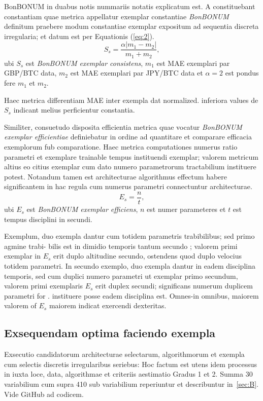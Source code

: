 \documentclass[preprint,3p,times,twocolumn]{elsarticle}  %
\begin{document}
BonBONUM in duabus notis nummariis notatis explicatum est. A constituebant 
constantiam quae metrica appellatur exemplar constantiae \textit{BonBONUM}
 definitum praebere modum constantiae exemplar expositum ad sequentia discreta 
irregularia; et datum est per Equationis (\ref{eq:2}).
\begin{equation}\label{eq:2}
                   S\!{_s} = \frac{\alpha|m_1-m_2|}
                               {m_1+m_2},
\end{equation}
ubi $S\!{_s}$ est \textit{BonBONUM exemplar consistens}, $m_1$ est 
MAE exemplari par GBP/BTC data, $m_2$ est MAE exemplari par JPY/BTC data 
et $\alpha = 2$ est pondus fere $m_1$ et $m_2$. 

Haec metrica differentiam MAE inter exempla dat normalized. inferiora
values de $S_s$ indicant melius perficientur constantia.

Similiter, consuetudo disposita efficientia metrica quae vocatur \textit{BonBONUM
exemplar efficientiae} definiebatur in ordine ad quantitare et comparare
efficacia exemplorum fub comparatione. Haec metrica computationes
numerus ratio parametri et exemplare trainable
tempus instituendi exemplar; valorem metricum altius eo citius
exemplar cum dato numero parametrorum tractabilium instituere potest.
Notandum tamen est architecturae algorithmus effectum habere significantem
in hac regula cum numerus parametri connectuntur
architecturae. 
\begin{equation}\label{eq:3}
                   E_s= \frac nt,
\end{equation}
ubi $E_s$ est \textit{BonBONUM exemplar efficiens}, $n$  est numer
parameteres et $t$ est tempus disciplini in secundi. 

Exemplum, duo exempla dantur cum totidem parametris trabibilibus;
sed primo agmine trabi- bilis est in dimidio temporis tantum secundo ;
valorem primi exemplar in $E_s$ erit duplo altitudine
secundo, ostendens quod duplo velocius totidem parametri.
In secundo exemplo, duo exempla dantur in eadem disciplina temporis, sed
cum duplici numero parametri ut exemplar primo
secundum, valorem primi exemplaris $E_s$ erit duplex secundi;
significans numerum duplicem parametri for . instituere posse
eadem disciplina est. Omnes-in omnibus, maiorem valorem of $E_s$ maiorem indicat
exercendi dexteritas. 

\subsection{Exsequendam optima faciendo exempla }
Exsecutio candidatorum architecturae selectarum, algorithmorum
et exempla cum selectis discretis irregularibus seriebus: Hoc factum est utens idem
processus in iuxta loce, data, algorithmae et criteriis aestimatio
Gradus 1 et 2. Summa 30 variabilium cum supra 410 sub variabilium
  reperiuntur et describuntur in~\ref{sec:B}. Vide GitHub ad codicem. 
\end{document}
